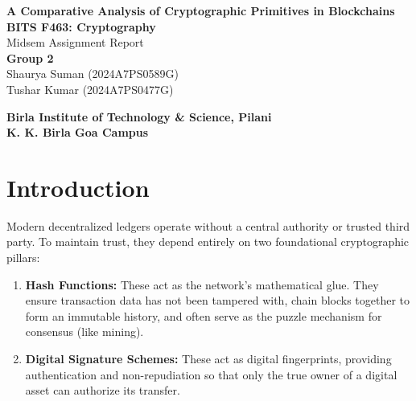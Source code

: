 \documentclass[11pt,a4paper,oneside]{book}
\begin{document}
\hypersetup{pageanchor=false}
\begin{titlepage}
    \vspace*{1.5in}

    \begin{center}
        {\Huge \textbf{A Comparative Analysis of Cryptographic Primitives in Blockchains}} \\[1.5in]

        {\Large \textbf{BITS F463: Cryptography}} \\[0.3em]
        {\Large Midsem Assignment Report} \\[1.5in]

        {\Large \textbf{Group 2}} \\[0.8em]
        {\large Shaurya Suman (2024A7PS0589G)} \\[0.3em]
        {\large Tushar Kumar (2024A7PS0477G)}
    \end{center}

    \vfill

    \begin{center}
        {\large \textbf{Birla Institute of Technology \& Science, Pilani}} \\[0.2em]
        {\large \textbf{K. K. Birla Goa Campus}}
    \end{center}
\end{titlepage}
\hypersetup{pageanchor=true}

\frontmatter
\tableofcontents
\newpage

\mainmatter

\chapter{Introduction}

Modern decentralized ledgers operate without a central authority or trusted third party. To maintain trust, they depend entirely on two foundational cryptographic pillars:
\begin{enumerate}
    \item \textbf{Hash Functions:} These act as the network's mathematical glue. They ensure transaction data has not been tampered with, chain blocks together to form an immutable history, and often serve as the puzzle mechanism for consensus (like mining).
    \item \textbf{Digital Signature Schemes:} These act as digital fingerprints, providing authentication and non-repudiation so that only the true owner of a digital asset can authorize its transfer.
\end{enumerate}
\end{document}
